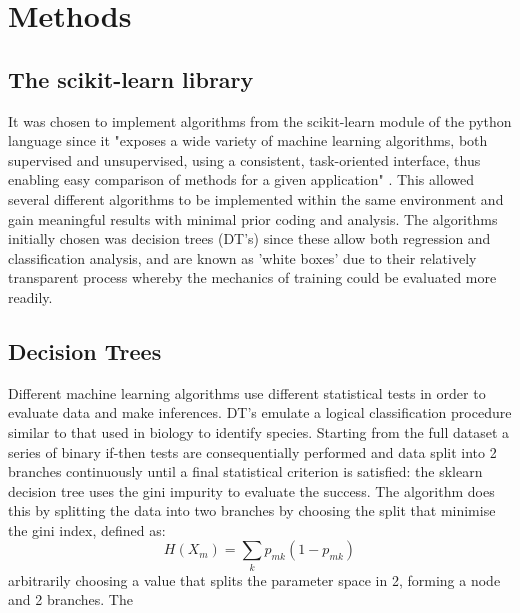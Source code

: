\chapter{Methods}
\label{ch:methods}
\section{The scikit-learn library}It was chosen to implement algorithms from the scikit-learn module of the python language since it "exposes a wide variety of machine learning algorithms, both supervised and unsupervised, using a consistent, task-oriented interface, thus enabling easy comparison of methods for a given application" \cite{Pedregosa2012}. This allowed several different algorithms to be implemented within the same environment and gain meaningful results with minimal prior coding and analysis. The algorithms initially chosen was decision trees (DT's) since these allow both regression and classification analysis, and are known as 'white boxes' due to their relatively transparent process whereby the mechanics of training could be evaluated more readily. 

\section{Decision Trees}
Different machine learning algorithms use different statistical tests in order to evaluate data and make inferences. DT's emulate a logical classification procedure similar to that used in biology to identify species. Starting from the full dataset a series of binary if-then tests are consequentially performed and data split into 2 branches continuously until a final statistical criterion is satisfied: the sklearn decision tree uses the gini impurity to evaluate the success. The algorithm does this by splitting the data into two branches by choosing the split that minimise the gini index, defined as:
\begin{equation}
H(X_m) = \sum_k p_{mk} (1 - p_{mk})
\end{equation}
arbitrarily choosing a value that splits the parameter space in 2, forming a node and 2 branches. The 


